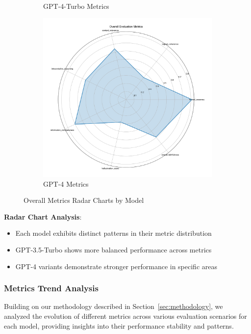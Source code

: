 \begin{figure}[!htbp]
\begin{subfigure}{0.3\textwidth}
    \caption{GPT-4-Turbo Metrics}
    \label{fig:overall_metrics_radar_gpt4t}
\end{subfigure}
\begin{subfigure}{0.3\textwidth}
    \includegraphics[width=\textwidth]{figures/overall/overall_metrics_radar_gpt-4.png}
    \caption{GPT-4 Metrics}
    \label{fig:overall_metrics_radar_gpt4}
\end{subfigure}
\caption{Overall Metrics Radar Charts by Model}
\label{fig:overall_metrics_radar}
\end{figure}

\textbf{Radar Chart Analysis}:
\begin{itemize}
    \item Each model exhibits distinct patterns in their metric distribution
    \item GPT-3.5-Turbo shows more balanced performance across metrics
    \item GPT-4 variants demonstrate stronger performance in specific areas
\end{itemize}

\subsubsection{Metrics Trend Analysis}
Building on our methodology described in Section~\ref{sec:methodology}, we analyzed the evolution of different metrics across various evaluation scenarios for each model, providing insights into their performance stability and patterns.

